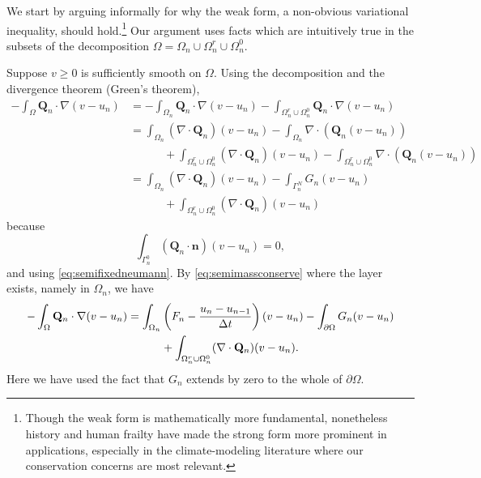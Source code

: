 \documentclass[final,leqno,onefignum,onetabnum]{siamltex1213bueler}
\newcommand\bn{\mathbf{n}}
\newcommand\bQ{\mathbf{Q}}
\newcommand{\Div}{\nabla\cdot}
\renewcommand{\grad}{\nabla}
\begin{document}
We start by arguing informally for why the weak form, a non-obvious variational inequality, should hold.\footnote{Though the weak form is mathematically more fundamental, nonetheless history and human frailty have made the strong form more prominent in applications, especially in the climate-modeling literature where our conservation concerns are most relevant.}  Our argument uses facts which are intuitively true in the subsets of the decomposition $\Omega = \Omega_n \cup \Omega_n^r \cup \Omega_n^0$.

Suppose $v\ge 0$ is sufficiently smooth on $\Omega$.  Using the decomposition and the divergence theorem (Green's theorem),
\begin{align*}
-\int_{\Omega} \bQ_n \cdot \grad(v-u_n) &= -\int_{\Omega_n} \bQ_n \cdot \grad(v-u_n) - \int_{\Omega_n^r \cup \Omega_n^0} \bQ_n \cdot \grad(v-u_n) \\
  &= \int_{\Omega_n} (\Div \bQ_n) (v-u_n) - \int_{\Omega_n} \Div \left(\bQ_n (v-u_n)\right) \\
  &\qquad\quad + \int_{\Omega_n^r \cup \Omega_n^0} (\Div \bQ_n) (v-u_n) - \int_{\Omega_n^r \cup \Omega_n^0} \Div \left(\bQ_n (v-u_n)\right) \\
  &= \int_{\Omega_n} (\Div \bQ_n) (v-u_n) - \int_{\Gamma_n^N} G_n (v-u_n) \\
  &\qquad\quad + \int_{\Omega_n^r \cup \Omega_n^0} (\Div \bQ_n) (v-u_n)
\end{align*}
because
       $$\int_{\Gamma_n^0} (\bQ_n \cdot \bn) (v-u_n) = 0,$$
and using \eqref{eq:semifixedneumann}.  By \eqref{eq:semimassconserve} where the layer exists, namely in $\Omega_n$, we have
\begin{align}
-\int_{\Omega} \bQ_n \cdot \grad(v-u_n) &= \int_{\Omega_n} \left(F_n - \frac{u_n - u_{n-1}}{\Delta t}\right) (v-u_n) - \int_{\partial \Omega} G_n (v-u_n) \label{eq:equalitybeforeVI} \\
  &\qquad\quad + \int_{\Omega_n^r \cup \Omega_n^0} (\Div \bQ_n) (v-u_n). \notag
\end{align}
Here we have used the fact that $G_n$ extends by zero to the whole of $\partial \Omega$.
\end{document}
